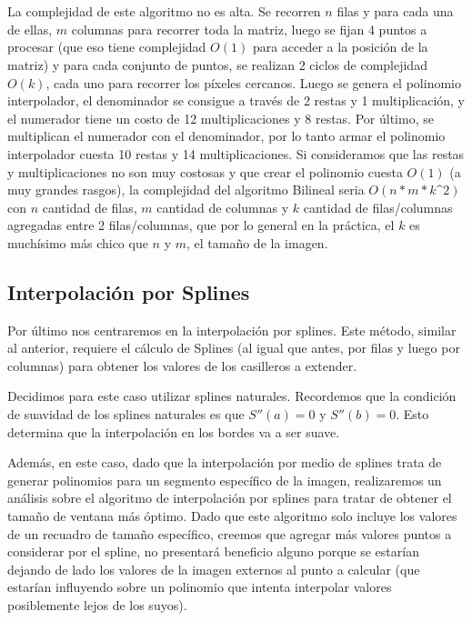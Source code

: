 \\
\\
La complejidad de este algoritmo no es alta. Se recorren $n$ filas y para cada una de ellas, $m$ columnas para recorrer toda la matriz, luego se fijan 4 puntos a procesar (que eso tiene complejidad $O(1)$ para acceder a la posición de la matriz) y para cada conjunto de puntos, se realizan 2 ciclos de complejidad $O(k)$, cada uno para recorrer los píxeles cercanos. Luego se genera el polinomio interpolador, el denominador se consigue a través de 2 restas y 1 multiplicación, y el numerador tiene un costo de 12 multiplicaciones y 8 restas. Por último, se multiplican el numerador con el denominador, por lo tanto armar el polinomio interpolador cuesta 10 restas y 14 multiplicaciones.
Si consideramos que las restas y multiplicaciones no son muy costosas y que crear el polinomio cuesta $O(1)$ (a muy grandes rasgos), la complejidad del algoritmo Bilineal seria $O(n*m*k\^{2})$ con $n$ cantidad de filas, $m$ cantidad de columnas y $k$ cantidad de filas/columnas agregadas entre 2 filas/columnas, que por lo general en la práctica, el $k$ es muchísimo más chico que $n$ y $m$, el tamaño de la imagen.


\subsection{Interpolación por Splines}
Por último nos centraremos en la interpolación por splines. Este método, similar al anterior, requiere el cálculo de Splines (al igual que antes, por filas y luego por columnas) para obtener los valores de los casilleros a extender.

Decidimos para este caso utilizar splines naturales. Recordemos que la condición de suavidad de los splines naturales es que $S''(a) = 0$ y $S''(b) = 0$. Esto determina que la interpolación en los bordes va a ser suave.

Además, en este caso, dado que la interpolación por medio de splines trata de generar polinomios para un segmento
específico de la imagen, realizaremos un análisis sobre el algoritmo de interpolación por splines para tratar de obtener el tamaño de ventana más óptimo. Dado que este algoritmo solo incluye los valores de un recuadro de tamaño específico, creemos que agregar más valores puntos a considerar por el spline, no presentará beneficio alguno porque se estarían dejando de lado los valores de la imagen externos al punto a calcular (que estarían influyendo sobre un polinomio que intenta interpolar valores posiblemente lejos de los suyos).

